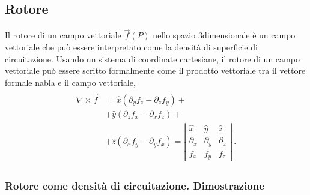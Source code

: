 \documentclass[letterpaper,10pt,italian]{jupyterBook}
\begin{document}
\subsection{Rotore}
\label{\detokenize{ch/vector-calculus/derivatives:rotore}}
\sphinxAtStartPar
Il rotore di un campo vettoriale \(\vec{f}(P)\) nello spazio 3\sphinxhyphen{}dimensionale è un campo vettoriale che può essere interpretato come la densità di superficie di circuitazione. Usando un sistema di coordinate cartesiane, il rotore di un campo vettoriale può essere scritto formalmente come il prodotto vettoriale tra il vettore formale nabla e il campo vettoriale,
\begin{equation*}
\begin{split}\begin{aligned}
  \nabla \times \vec{f} & = \hat{x} \left( \partial_y f_z - \partial_z f_y \right) + \\ 
                        & + \hat{y} \left( \partial_z f_x - \partial_x f_z \right) + \\
                        & + \hat{z} \left( \partial_x f_y - \partial_y f_x \right) 
    = \left| \begin{matrix} \hat{x} & \hat{y} & \hat{z} \\ \partial_x & \partial_y & \partial_z \\ f_x & f_y & f_z \end{matrix} \right| \ .
\end{aligned}\end{split}
\end{equation*}\subsubsection*{Rotore come densità di circuitazione. Dimostrazione}
\end{document}
